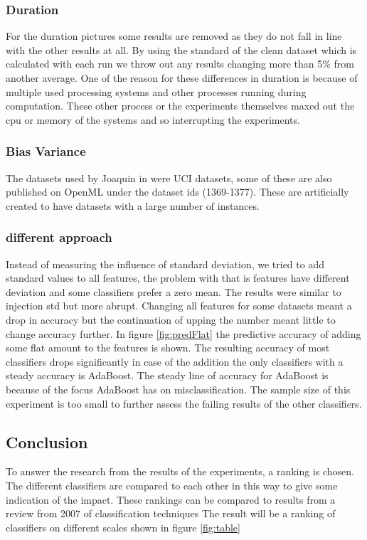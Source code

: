 \documentclass[a4paper,10pt]{article}
\begin{document}
\subsubsection{Duration}
For the duration pictures some results are removed as they do not fall in line with the other results at all. By using the standard of the clean dataset which is calculated with each run we throw out any results changing more than 5$\%$ from another average. One of the reason for these differences in duration is because of multiple used processing systems and other processes running during computation. These other process or the experiments themselves maxed out the cpu or memory of the systems and so interrupting the experiments.

\subsubsection{Bias Variance}
The datasets used by Joaquin in \cite{Bias-var} were UCI datasets, some of these are also published on OpenML under the dataset ids (1369-1377). These are artificially created to have datasets with a large number of instances.%


\subsubsection{different approach}
Instead of measuring the influence of standard deviation, we tried to add standard values to all features, the problem with that is features have different deviation and some classifiers prefer a zero mean. The results were similar to injection std but more abrupt. Changing all features for some datasets meant a drop in accuracy but the continuation of upping the number meant little to change accuracy further. In figure \ref{fig:predFlat} the predictive accuracy of adding some flat amount to the features is shown. The resulting accuracy of most classifiers drops significantly in case of the addition the only classifiers with a steady accuracy is AdaBoost. The steady line of accuracy for AdaBoost is because of the focus AdaBoost has on misclassification. The sample size of this experiment is too small to further assess the failing results of the other classifiers.  


\subsection{Conclusion}
To answer the research from the results of the experiments, a ranking is chosen. The different classifiers are compared to each other in this way to give some indication of the impact.
These rankings can be compared to results from a review from 2007 of classification techniques \cite{RevClass}
The result will be a ranking of classifiers on different scales shown in figure \ref{fig:table}
\end{document}
